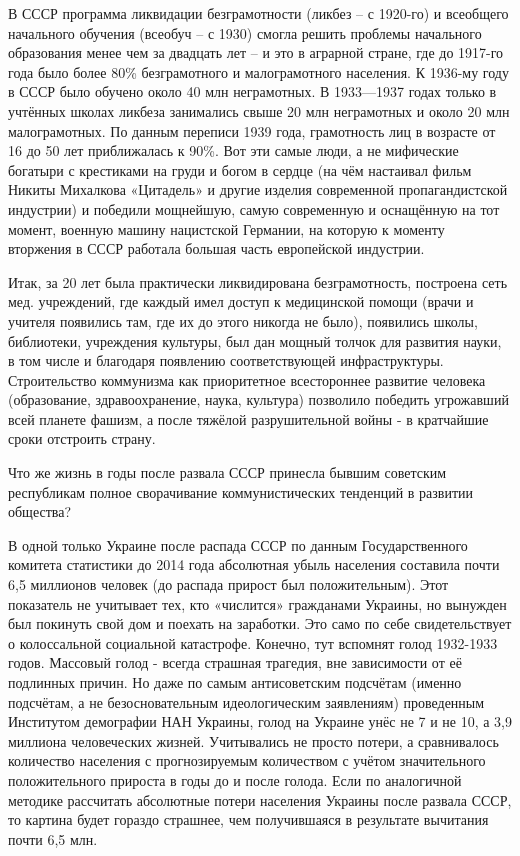 \documentclass[../main]{subfiles}
\begin{document}
В СССР программа ликвидации безграмотности (ликбез – с 1920-го) и всеобщего начального обучения (всеобуч – с 1930) смогла решить проблемы начального образования менее чем за двадцать лет – и это в аграрной стране, где до 1917-го года было более 80\% безграмотного и малограмотного населения. К 1936-му году в СССР было обучено около 40 млн неграмотных. В 1933—1937 годах только в учтённых школах ликбеза занимались свыше 20 млн неграмотных и около 20 млн малограмотных. По данным переписи 1939 года, грамотность лиц в возрасте от 16 до 50 лет приближалась к 90\%. Вот эти самые люди, а не мифические богатыри с крестиками на груди и богом в сердце (на чём настаивал фильм Никиты Михалкова «Цитадель» и другие изделия современной пропагандистской индустрии) и победили мощнейшую, самую современную и оснащённую на тот момент, военную машину нацистской Германии, на которую к моменту вторжения в СССР работала большая часть европейской индустрии.

Итак, за 20 лет была практически ликвидирована безграмотность, построена сеть мед. учреждений, где каждый имел доступ к медицинской помощи (врачи и учителя появились там, где их до этого никогда не было), появились школы, библиотеки, учреждения культуры, был дан мощный толчок для развития науки, в том числе и благодаря появлению соответствующей инфраструктуры. Строительство коммунизма как приоритетное всестороннее развитие человека (образование, здравоохранение, наука, культура) позволило победить угрожавший всей планете фашизм, а после тяжёлой разрушительной войны - в кратчайшие сроки отстроить страну.

Что же жизнь в годы после развала СССР принесла бывшим советским республикам полное сворачивание коммунистических тенденций в развитии общества?

В одной только Украине после распада СССР по данным Государственного комитета статистики до 2014 года абсолютная убыль населения составила почти 6,5 миллионов человек (до распада прирост был положительным). Этот показатель не учитывает тех, кто «числится» гражданами Украины, но вынужден был покинуть свой дом и поехать на заработки. Это само по себе свидетельствует о колоссальной социальной катастрофе. Конечно, тут вспомнят голод 1932-1933 годов. Массовый голод - всегда страшная трагедия, вне зависимости от её подлинных причин. Но даже по самым антисоветским подсчётам (именно подсчётам, а не безосновательным идеологическим заявлениям) проведенным Институтом демографии НАН Украины, голод на Украине унёс не 7 и не 10, а 3,9 миллиона человеческих жизней. Учитывались не просто потери, а сравнивалось количество населения с прогнозируемым количеством с учётом значительного положительного прироста в годы до и после голода. Если по аналогичной методике рассчитать абсолютные потери населения Украины после развала СССР, то картина будет гораздо страшнее, чем получившаяся в результате вычитания почти 6,5 млн.
\end{document}
